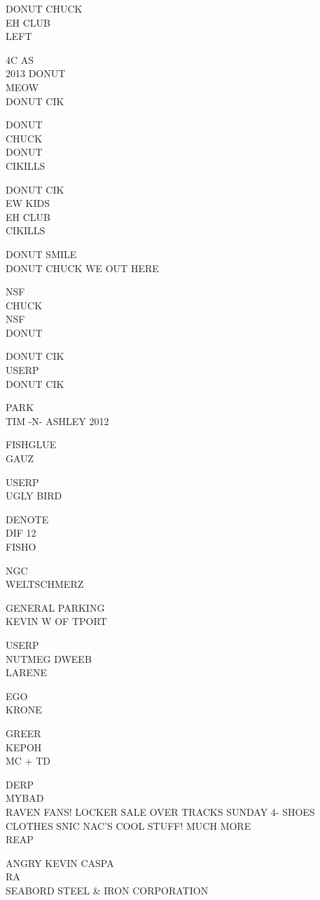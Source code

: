 \documentclass[10pt,letterpaper]{article}
\begin{document}
DONUT CHUCK\\
EH CLUB\\
LEFT

4C AS\\
2013 DONUT\\
MEOW\\
DONUT CIK

DONUT\\
CHUCK\\
DONUT\\
CIKILLS

DONUT CIK\\
EW KIDS\\
EH CLUB\\
CIKILLS

DONUT SMILE\\
DONUT CHUCK WE OUT HERE

NSF\\
CHUCK\\
NSF\\
DONUT

DONUT CIK\\
USERP\\
DONUT CIK

PARK\\
TIM {-}N{-} ASHLEY 2012

FISHGLUE\\
GAUZ

USERP\\
UGLY BIRD

DENOTE\\
DIF 12\\
FISHO

NGC\\
WELTSCHMERZ

GENERAL PARKING\\
KEVIN W OF TPORT

USERP\\
NUTMEG DWEEB\\
LARENE

EGO\\
KRONE

GREER\\
KEPOH\\
MC + TD

DERP\\
MYBAD\\
RAVEN FANS!  LOCKER SALE OVER TRACKS SUNDAY 4{-} SHOES CLOTHES SNIC NAC'S COOL STUFF!  MUCH MORE\\
REAP

ANGRY KEVIN CASPA\\
RA\\
SEABORD STEEL \& IRON CORPORATION
\end{document}
